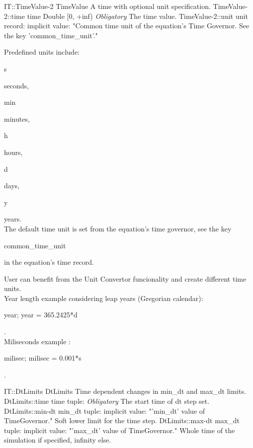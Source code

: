 \begin{TupleType}
	{IT::TimeValue-2}
	{TimeValue}
	{}%
	{}%
	{{{A time with optional unit specification.}%
}}
		\RecKey
			{TimeValue-2::time}
			{time}
			{{Double [0, +inf)}}{}
			{ \it{Obligatory}}
			{{{The time value.}%
}}
		\RecKey
			{TimeValue-2::unit}
			{unit}
			{{record: }}{}
			{implicit value: "{Common time unit of the equation's Time Governor.
See the key 'common{\_}time{\_}unit'.}"}
			{{{{Predefined units include: }\begin{ttfamily}s\end{ttfamily}{ seconds, }\begin{ttfamily}min\end{ttfamily}{ minutes, }\begin{ttfamily}h\end{ttfamily}{ hours, }\begin{ttfamily}d\end{ttfamily}{ days, }\begin{ttfamily}y\end{ttfamily}{ years.}\\{
The default time unit is set from the equation's time governor, see the key }\begin{ttfamily}common{\_}time{\_}unit\end{ttfamily}{in the equation's time record.}
% 
}{{User can benefit from the Unit Convertor funcionality and create different time units.}\\{
Year length example considering leap years (Gregorian calendar): }\begin{ttfamily}year; year = 365.2425*d\end{ttfamily}{.}\\{
Miliseconds example : }\begin{ttfamily}milisec; milisec = 0.001*s\end{ttfamily}{.}%
}}}
\end{TupleType}
\begin{TupleType}
	{IT::DtLimits}
	{DtLimits}
	{}%
	{}%
	{{{Time dependent changes in min{\_}dt and max{\_}dt limits.}%
}}
		\RecKey
			{DtLimits::time}
			{time}
			{{tuple: }}{}
			{ \it{Obligatory}}
			{{{The start time of dt step set.}%
}}
		\RecKey
			{DtLimits::min-dt}
			{min{\_}dt}
			{{tuple: }}{}
			{implicit value: "{'min{\_}dt' value of TimeGovernor.}"}
			{{{Soft lower limit for the time step.}%
}}
		\RecKey
			{DtLimits::max-dt}
			{max{\_}dt}
			{{tuple: }}{}
			{implicit value: "{'max{\_}dt' value of TimeGovernor.}"}
			{{{Whole time of the simulation if specified, infinity else.}%
}}
\end{TupleType}
